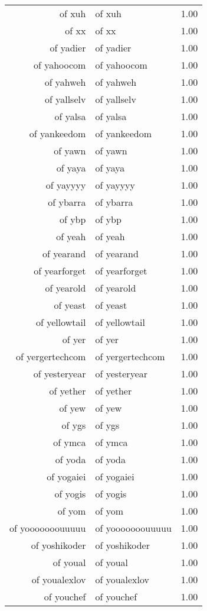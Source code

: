\begin{table}[ht]
\begin{tabular}{rlr}
  of xuh & of xuh & 1.00 \\ 
  of xx & of xx & 1.00 \\ 
  of yadier & of yadier & 1.00 \\ 
  of yahoocom & of yahoocom & 1.00 \\ 
  of yahweh & of yahweh & 1.00 \\ 
  of yallselv & of yallselv & 1.00 \\ 
  of yalsa & of yalsa & 1.00 \\ 
  of yankeedom & of yankeedom & 1.00 \\ 
  of yawn & of yawn & 1.00 \\ 
  of yaya & of yaya & 1.00 \\ 
  of yayyyy & of yayyyy & 1.00 \\ 
  of ybarra & of ybarra & 1.00 \\ 
  of ybp & of ybp & 1.00 \\ 
  of yeah & of yeah & 1.00 \\ 
  of yearand & of yearand & 1.00 \\ 
  of yearforget & of yearforget & 1.00 \\ 
  of yearold & of yearold & 1.00 \\ 
  of yeast & of yeast & 1.00 \\ 
  of yellowtail & of yellowtail & 1.00 \\ 
  of yer & of yer & 1.00 \\ 
  of yergertechcom & of yergertechcom & 1.00 \\ 
  of yesteryear & of yesteryear & 1.00 \\ 
  of yether & of yether & 1.00 \\ 
  of yew & of yew & 1.00 \\ 
  of ygs & of ygs & 1.00 \\ 
  of ymca & of ymca & 1.00 \\ 
  of yoda & of yoda & 1.00 \\ 
  of yogaiei & of yogaiei & 1.00 \\ 
  of yogis & of yogis & 1.00 \\ 
  of yom & of yom & 1.00 \\ 
  of yooooooouuuuu & of yooooooouuuuu & 1.00 \\ 
  of yoshikoder & of yoshikoder & 1.00 \\ 
  of youal & of youal & 1.00 \\ 
  of youalexlov & of youalexlov & 1.00 \\ 
  of youchef & of youchef & 1.00 \\ 

\end{tabular}
\end{table}

